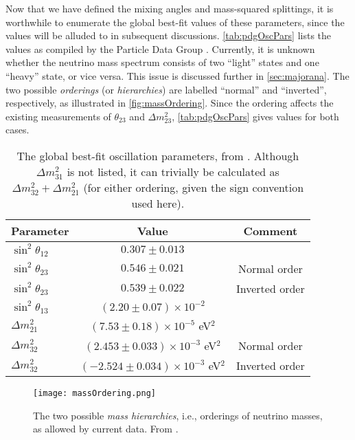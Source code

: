 \documentclass[../thesis.tex]{subfiles}
\begin{document}
Now that we have defined the mixing angles and mass-squared splittings, it is worthwhile to enumerate the global best-fit values of these parameters, since the values will be alluded to in subsequent discussions. \autoref{tab:pdgOscPars} lists the values as compiled by the Particle Data Group \cite{PDG}. Currently, it is unknown whether the neutrino mass spectrum consists of two ``light'' states and one ``heavy'' state, or vice versa. This issue is discussed further in \autoref{sec:majorana}. The two possible \emph{orderings} (or \emph{hierarchies}) are labelled ``normal'' and ``inverted'', respectively, as illustrated in \autoref{fig:massOrdering}. Since the ordering affects the existing measurements of $\theta_{23}$ and $\Delta m^2_{23}$, \autoref{tab:pdgOscPars} gives values for both cases.

\begin{table}[h]
  \begin{tabular}{lcc}
    \toprule
    Parameter & Value & Comment \\
    \midrule
    $\sin^2 \theta_{12}$ & $0.307 \pm 0.013$ & \\
    $\sin^2 \theta_{23}$ & $0.546 \pm 0.021$ & Normal order \\
    $\sin^2 \theta_{23}$ & $0.539 \pm 0.022$ & Inverted order \\
    $\sin^2 \theta_{13}$ & $(2.20 \pm 0.07) \times 10^{-2}$ & \\
    \midrule
    $\Delta m^2_{21}$ & $(7.53 \pm 0.18) \times 10^{-5}$ eV$^2$ & \\
    $\Delta m^2_{32}$ & $(2.453 \pm 0.033) \times 10^{-3}$ eV$^2$ & Normal order \\
    $\Delta m^2_{32}$ & $(-2.524 \pm 0.034) \times 10^{-3}$ eV$^2$ & Inverted order \\
    \bottomrule
  \end{tabular}
  \caption{The global best-fit oscillation parameters, from \cite{PDG}. Although $\Delta m^2_{31}$ is not listed, it can trivially be calculated as $\Delta m^2_{32} + \Delta m^2_{21}$ (for either ordering, given the sign convention used here).}
  \label{tab:pdgOscPars}
\end{table}

\begin{figure}[h]
  \texttt{[image: massOrdering.png]}
  \caption{The two possible \emph{mass hierarchies}, i.e., orderings of neutrino masses, as allowed by current data. From \cite{NuPhysWithJUNO}.}
  \label{fig:massOrdering}
\end{figure}
\end{document}
